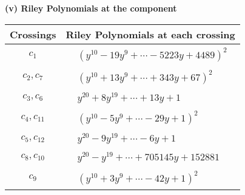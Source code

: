 \documentclass[1p]{elsarticle_modified}
\theoremstyle{definition}
\begin{document}
\newpage\renewcommand{\arraystretch}{1}
\flushleft \textbf{(v) Riley Polynomials at the component}\newline \\
\begin{tabular}{m{50pt}|m{274pt}}
Crossings & \hspace{64pt}Riley Polynomials at each crossing \\
\hline $$\begin{aligned}c_{1}\end{aligned}$$&$\begin{aligned}
&(y^{10}-19 y^9+\cdots-5223 y+4489)^{2}
\end{aligned}$\\
\hline $$\begin{aligned}c_{2},c_{7}\end{aligned}$$&$\begin{aligned}
&(y^{10}+13 y^9+\cdots+343 y+67)^{2}
\end{aligned}$\\
\hline $$\begin{aligned}c_{3},c_{6}\end{aligned}$$&$\begin{aligned}
&y^{20}+8 y^{19}+\cdots+13 y+1
\end{aligned}$\\
\hline $$\begin{aligned}c_{4},c_{11}\end{aligned}$$&$\begin{aligned}
&(y^{10}-5 y^9+\cdots-29 y+1)^{2}
\end{aligned}$\\
\hline $$\begin{aligned}c_{5},c_{12}\end{aligned}$$&$\begin{aligned}
&y^{20}-9 y^{19}+\cdots-6 y+1
\end{aligned}$\\
\hline $$\begin{aligned}c_{8},c_{10}\end{aligned}$$&$\begin{aligned}
&y^{20}- y^{19}+\cdots+705145 y+152881
\end{aligned}$\\
\hline $$\begin{aligned}c_{9}\end{aligned}$$&$\begin{aligned}
&(y^{10}+3 y^9+\cdots-42 y+1)^{2}
\end{aligned}$\\
\hline
\end{tabular}\\~\\
\end{document}
